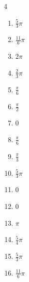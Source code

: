 \begin{multicols}{4}
\begin{enumerate}
  \item $\displaystyle \frac{5}{3}\pi$

  \item $\displaystyle \frac{11}{6}\pi$

  \item $\displaystyle 2\pi$

  \item $\displaystyle \frac{2}{3}\pi$

  \item $\displaystyle \frac{\pi}{6}$

  \item $\displaystyle \frac{\pi}{2}$

  \item $\displaystyle 0$

  \item $\displaystyle \frac{\pi}{6}$

\columnbreak %

  \item $\displaystyle \frac{\pi}{3}$

  \item $\displaystyle \frac{5}{3}\pi$

  \item $\displaystyle 0$

  \item $\displaystyle 0$

  \item $\displaystyle \pi$

  \item $\displaystyle \frac{5}{4}\pi$

  \item $\displaystyle \frac{5}{3}\pi$

  \item $\displaystyle \frac{11}{6}\pi$


\end{enumerate}
\end{multicols}
